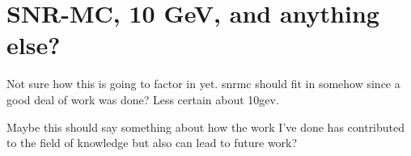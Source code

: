\chapter{SNR-MC, 10 GeV, and anything else?}
\label{chap:other}

Not sure how this is going to factor in yet. \gls{snrmc} should fit in somehow since a good deal of work was done? Less certain about 10gev. 

Maybe this should say something about how the work I've done has contributed to the field of knowledge but also can lead to future work?